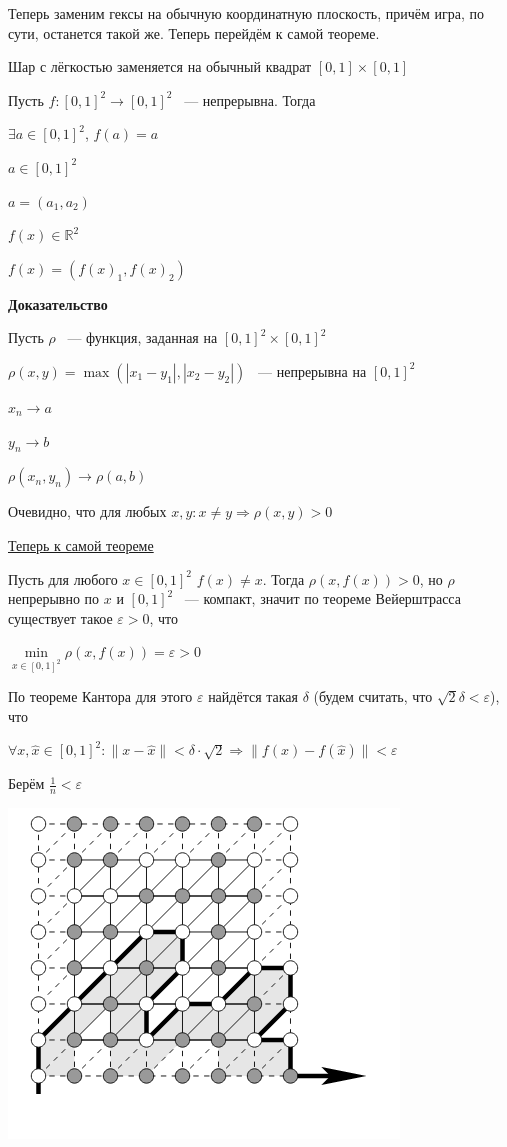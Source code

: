 \documentclass{article}
\begin{document}
			Теперь заменим гексы на обычную координатную плоскость, причём игра, по сути, останется такой же. Теперь перейдём к самой теореме.
			
			Шар с лёгкостью заменяется на обычный квадрат $[0, 1] \times [0, 1]$
			
			Пусть $f : [0, 1]^2 \rightarrow [0, 1]^2$ ~--- непрерывна. Тогда
			
			$\exists a \in [0, 1]^2$, $f(a) = a$
			
			$a \in [0, 1]^2$
			
			$a = (a_1, a_2)$
			
			$f(x) \in \mathbb{R}^2$
			
			$f(x) = (f(x)_1, f(x)_2)$
			
			\textbf{Доказательство}
			
				Пусть $\rho$ ~--- функция, заданная на $[0, 1]^2 \times [0, 1]^2$
				
				$\rho(x, y) = \max (|x_1 - y_1|, |x_2 - y_2|)$ ~--- непрерывна на $[0, 1]^2$
				
				$x_n \rightarrow a$
				
				$y_n \rightarrow b$
				
				$\rho(x_n, y_n) \rightarrow \rho(a, b)$
				
				Очевидно, что для любых $x, y: x \neq y \Rightarrow \rho(x, y) > 0$
				
				\underline{Теперь к самой теореме}
				
				Пусть для любого $x \in [0, 1]^2$ $f(x) \neq x$. Тогда $\rho(x, f(x)) > 0$, но $\rho$ непрерывно по $x$ и $[0, 1]^2$ ~--- компакт, значит по теореме Вейерштрасса существует такое $\varepsilon > 0$, что
				
				$\min\limits_{x \in [0, 1]^2} \rho(x, f(x)) = \varepsilon > 0$
				
				По теореме Кантора для этого $\varepsilon$ найдётся такая $\delta$ (будем считать, что $\sqrt{2} \delta < \varepsilon$), что
				
				$\forall x, \widehat{x} \in [0, 1]^2 : \| x - \widehat{x} \| < \delta \cdot \sqrt{2} \Rightarrow \| f(x) - f(\widehat{x}) \| < \varepsilon$
				
				Берём $\frac{1}{n} < \varepsilon$
				
				\includegraphics[scale=0.45]{HEXTHEOREM.png}
				
\end{document}
